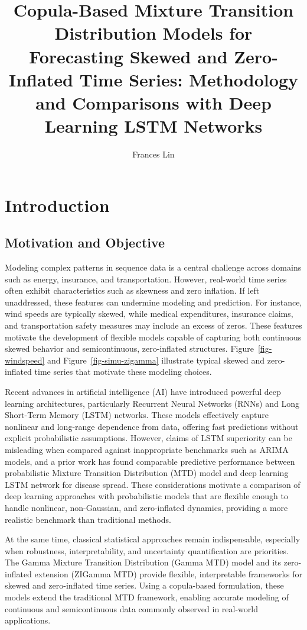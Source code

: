 \documentclass[
  letterpaper,
  double,
  12pt,
  1.0in]{beavtex}
\title{Copula-Based Mixture Transition Distribution Models for
Forecasting Skewed and Zero-Inflated Time Series: Methodology and
Comparisons with Deep Learning LSTM
Networks} %
\author{Frances Lin} %
\begin{document}
\frontmatter
\maketitle
\mainmatter
{}

\chapter{Introduction}\label{sec-intro}

\section{Motivation and Objective}\label{motivation-and-objective}

Modeling complex patterns in sequence data is a central challenge across
domains such as energy, insurance, and transportation. However,
real-world time series often exhibit characteristics such as skewness
and zero inflation. If left unaddressed, these features can undermine
modeling and prediction. For instance, wind speeds are typically skewed,
while medical expenditures, insurance claims, and transportation safety
measures may include an excess of zeros. These features motivate the
development of flexible models capable of capturing both continuous
skewed behavior and semicontinuous, zero-inflated structures.
Figure~\ref{fig-windspeed} and Figure~\ref{fig-simu-zigamma} illustrate
typical skewed and zero-inflated time series that motivate these
modeling choices.

Recent advances in artificial intelligence (AI) have introduced powerful
deep learning architectures, particularly Recurrent Neural Networks
(RNNs) and Long Short-Term Memory (LSTM) networks. These models
effectively capture nonlinear and long-range dependence from data,
offering fast predictions without explicit probabilistic assumptions.
However, claims of LSTM superiority can be misleading when compared
against inappropriate benchmarks such as ARIMA models, and a prior work
has found comparable predictive performance between probabilistic
Mixture Transition Distribution (MTD) model and deep learning LSTM
network for disease spread. These considerations motivate a comparison
of deep learning approaches with probabilistic models that are flexible
enough to handle nonlinear, non-Gaussian, and zero-inflated dynamics,
providing a more realistic benchmark than traditional methods.

At the same time, classical statistical approaches remain indispensable,
especially when robustness, interpretability, and uncertainty
quantification are priorities. The Gamma Mixture Transition Distribution
(Gamma MTD) model and its zero-inflated extension (ZIGamma MTD) provide
flexible, interpretable frameworks for skewed and zero-inflated time
series. Using a copula-based formulation, these models extend the
traditional MTD framework, enabling accurate modeling of continuous and
semicontinuous data commonly observed in real-world applications.
\end{document}
